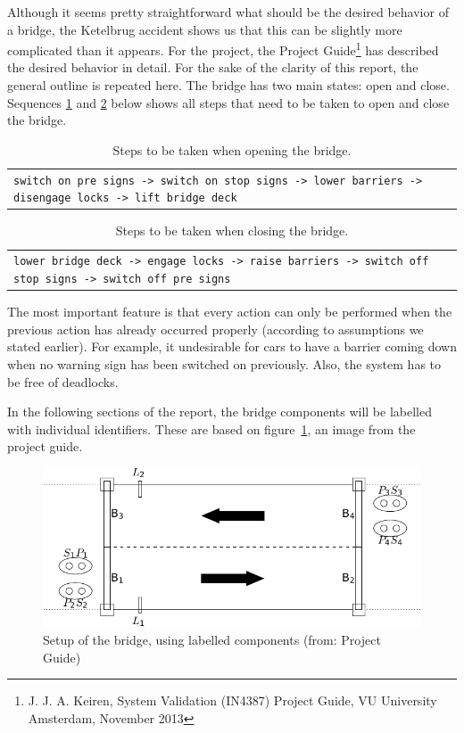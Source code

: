 Although it seems pretty straightforward what should be the desired behavior of a bridge, the Ketelbrug accident shows us that this can be slightly more complicated than it appears. For the project, the Project Guide\footnote{J. J. A. Keiren, System Validation (IN4387) Project Guide, VU University Amsterdam, November 2013} has described the desired behavior in detail. For the sake of the clarity of this report, the general outline is repeated here. The bridge has two main states: open and close. Sequences \ref{tab:open} and \ref{tab:close} below shows all steps that need to be taken to open and close the bridge.
%
\begin{table}[h]%
\begin{tabular}{l}
	\footnotesize
	\texttt{switch on pre signs -> switch on stop signs -> lower barriers -> disengage locks -> lift bridge deck}\\
\end{tabular}
\caption{Steps to be taken when opening the bridge.}
\label{tab:open}
\end{table}
%
\begin{table}[h]%
\begin{tabular}{l}
	\footnotesize
	\texttt{lower bridge deck -> engage locks -> raise barriers -> switch off stop signs -> switch off pre signs}\\
\end{tabular}
\caption{Steps to be taken when closing the bridge.}
\label{tab:close}
\end{table}
%
The most important feature is that every action can only be performed when the previous action has already occurred properly (according to assumptions we stated earlier). For example, it undesirable for cars to have a barrier coming down when no warning sign has been switched on previously. Also, the system has to be free of deadlocks.

In the following sections of the report, the bridge components will be labelled with individual identifiers. These are based on figure~\ref{fig:setup}, an image from the project guide.
%
\begin{figure}[htb]%
\includegraphics[width=\columnwidth]{Images/setup.pdf}%
\caption{Setup of the bridge, using labelled components (from: Project Guide)}%
\label{fig:setup}%
\end{figure}
%

\newpage

